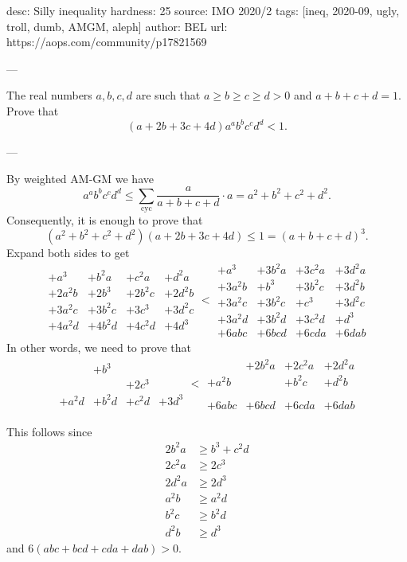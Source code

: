 desc: Silly inequality
hardness: 25
source: IMO 2020/2
tags: [ineq, 2020-09, ugly, troll, dumb, AMGM, aleph]
author: BEL
url: https://aops.com/community/p17821569

---

The real numbers $a, b, c, d$
are such that $a\geq b\geq c\geq d>0$ and $a+b+c+d=1$.
Prove that
\[ (a+2b+3c+4d) a^a b^b c^c d^d < 1. \]

---

By weighted AM-GM we have
\[ a^a b^b c^c d^d \le \sum_{\text{cyc}} \frac{a}{a+b+c+d} \cdot a
  = a^2+b^2+c^2+d^2. \]
Consequently, it is enough to prove that
\[ (a^2+b^2+c^2+d^2)(a+2b+3c+4d) \le 1 = (a+b+c+d)^3. \]
Expand both sides to get
\[
  \begin{array}{cccc}
    +a^3 &+ b^2a &+ c^2a & +d^2a \\
    +2a^2b &+ 2b^3 &+ 2b^2c  & +2d^2b \\
    +3a^2c & + 3b^2c & + 3c^3 & + 3d^2c \\
    +4a^2d &+ 4b^2d & + 4c^2d & + 4d^3
  \end{array}
  <
  \begin{array}{cccc}
    +a^3 &+ 3b^2a &+ 3c^2a & +3d^2a \\
    +3a^2b &+ b^3 &+ 3b^2c  & +3d^2b \\
    +3a^2c &+ 3b^2c &+ c^3 &+ 3d^2c \\
    +3a^2d &+ 3b^2d &+ 3c^2d &+ d^3 \\
    +6abc &+ 6bcd &+ 6cda &+ 6dab
  \end{array}
\]
In other words, we need to prove that
\[
  \begin{array}{cccc}
    & && \\
    &+ b^3 & & \\
    & & +2c^3 & \\
    +a^2d &+ b^2d & + c^2d & + 3d^3 \\
  \end{array}
  <
  \begin{array}{cccc}
    &+ 2b^2a &+ 2c^2a & +2d^2a \\
    +a^2b & &+ b^2c  & +d^2b \\
    &&& \\
    &&& \\
    +6abc &+ 6bcd &+ 6cda &+ 6dab
  \end{array}
\]

This follows since
\begin{align*}
  2b^2a &\ge b^3 + c^2d \\
  2c^2a &\ge 2c^3 \\
  2d^2a &\ge 2d^3  \\
  a^2b &\ge a^2d \\
  b^2c &\ge b^2d \\
  d^2b &\ge d^3
\end{align*}
and $6(abc+bcd+cda+dab) > 0$.

